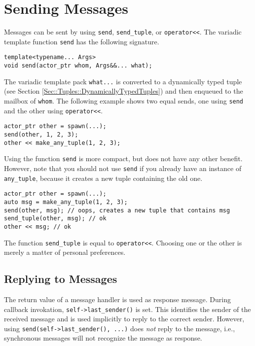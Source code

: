 \section{Sending Messages}
\label{Sec::Send}

Messages can be sent by using \lstinline^send^, \lstinline^send_tuple^, or \lstinline^operator<<^. The variadic template function \lstinline^send^ has the following signature.

\begin{lstlisting}
template<typename... Args>
void send(actor_ptr whom, Args&&... what);
\end{lstlisting}

The variadic template pack \lstinline^what...^ is converted to a dynamically typed tuple (see Section \ref{Sec::Tuples::DynamicallyTypedTuples}) and then enqueued to the mailbox of \lstinline^whom^.
The following example shows two equal sends, one using \lstinline^send^ and the other using \lstinline^operator<<^.

\begin{lstlisting}
actor_ptr other = spawn(...);
send(other, 1, 2, 3);
other << make_any_tuple(1, 2, 3);
\end{lstlisting}

Using the function \lstinline^send^ is more compact, but does not have any other benefit.
However, note that you should not use \lstinline^send^ if you already have an instance of \lstinline^any_tuple^, because it creates a new tuple containing the old one.

\begin{lstlisting}
actor_ptr other = spawn(...);
auto msg = make_any_tuple(1, 2, 3);
send(other, msg); // oops, creates a new tuple that contains msg
send_tuple(other, msg); // ok
other << msg; // ok
\end{lstlisting}

The function \lstinline^send_tuple^ is equal to \lstinline^operator<<^.
Choosing one or the other is merely a matter of personal preferences.

\clearpage
\subsection{Replying to Messages}
\label{Sec::Send::Reply}

The return value of a message handler is used as response message.
During callback invokation, \lstinline^self->last_sender()^ is set.
This identifies the sender of the received message and is used implicitly to reply to the correct sender.
However, using \lstinline^send(self->last_sender(), ...)^ does \emph{not} reply to the message, i.e., synchronous messages will not recognize the message as response.

